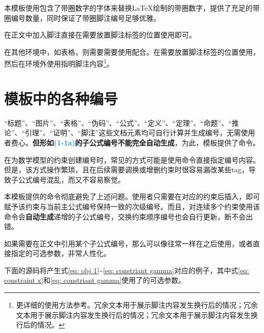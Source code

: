 \documentclass[doctor, vlined, ]{DissertUESTC}
\begin{document}
	本模板使用包含了带圈数字的字体来替换LaTeX绘制的带圈数字，提供了充足的带圈编号数量，同时保证了带圈脚注编号足够优雅。
	
	在正文中加入脚注直接在需要放置脚注标签的位置使用即可。
	
	在其他环境中，如表格，则需要需要使用配合。在需要放置脚注标签的位置使用，然后在环境外使用指明脚注内容\footnote{更详细的使用方法参考\href{https://blog.csdn.net/xovee/article/details/127563209}{\ttfamily\color{DarkRed}}。冗余文本用于展示脚注内容发生换行后的情况；冗余文本用于展示脚注内容发生换行后的情况；冗余文本用于展示脚注内容发生换行后的情况。}。
	
	
	\section{模板中的各种编号}
	
	“标题”、“图片”、“表格”、“伪码”、“公式”、“定义”、“定理”、“命题”、“推论”、“引理”、“证明”、“脚注”这些文档元素均可自行计算并生成编号，无需使用者费心。\textbf{但形如\textcolor{DodgerBlue}{(1-1a)}的子公式编号不能完全自动生成}，为此，模板提供了命令。

	在为数学模型的约束创建编号时，常见的方式可能是使用命令直接指定编号内容。但是，该方式操作繁琐，且在后续需要调换或增删约束时很容易漏改某些tag，导致子公式编号混乱，而又不容易察觉。

	本模板提供的命令彻底避免了上述问题。使用者只需要在对应的约束后插入，即可赋予该约束与当前主公式编号保持一致的次级编号。而且，对连续多个约束使用该命令会\textbf{自动生成}递增的子公式编号，交换约束顺序编号也会自行更新，断不会出错。
	
	如果需要在正文中引用某个子公式编号，那么可以像往常一样在之后使用，或者直接指定的可选参数，非常人性化。
	
	下面的源码将产生式\eqref{eq: obj 1}\textasciitilde \eqref{eq: constriant gamma}对应的例子，其中式\eqref{eq: constraint x}和\eqref{eq: constriant gamma}使用了的可选参数。
\end{document}
